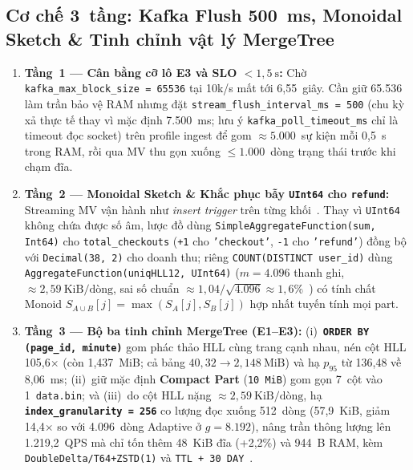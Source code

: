 \documentclass[13pt,a4paper]{report}
\begin{document}
\subsection{Cơ chế 3~tầng: Kafka Flush 500~ms, Monoidal Sketch \& Tinh chỉnh vật lý MergeTree}
\begin{enumerate}
    \setlength{\itemsep}{2pt}\setlength{\parskip}{0pt}
    \item \textbf{Tầng~1 --- Cân bằng cỡ lô E3 và SLO $< 1{,}5~\text{s}$:} Chờ \texttt{kafka\_\allowbreak{}max\_\allowbreak{}block\_\allowbreak{}size = 65536} tại 10k/s mất tới 6,55~giây. Cần giữ 65.536 làm trần bảo vệ RAM nhưng đặt \texttt{stream\_\allowbreak{}flush\_\allowbreak{}interval\_\allowbreak{}ms = 500} (chu kỳ xả thực tế thay vì mặc định 7.500~ms; lưu ý \texttt{kafka\_\allowbreak{}poll\_\allowbreak{}timeout\_\allowbreak{}ms} chỉ là timeout đọc socket) trên profile ingest để gom $\approx 5.000$~sự kiện mỗi 0,5~s trong RAM, rồi qua MV thu gọn xuống $\le 1.000$~dòng trạng thái trước khi chạm đĩa.
    \item \textbf{Tầng~2 --- Monoidal Sketch \& Khắc phục bẫy \texttt{UInt64} cho \texttt{refund}:} Streaming MV vận hành như \textit{insert trigger} trên từng khối~\cite{S14}. Thay vì \texttt{UInt64} không chứa được số âm, lược đồ dùng \texttt{SimpleAggregateFunction(sum, Int64)} cho \texttt{total\_\allowbreak{}checkouts} (\texttt{+1} cho \texttt{'checkout'}, \texttt{-1} cho \texttt{'refund'}) đồng bộ với \texttt{Decimal(38, 2)} cho doanh thu; riêng \texttt{COUNT(\allowbreak{}DISTINCT user\_\allowbreak{}id)} dùng \texttt{AggregateFunction(\allowbreak{}uniqHLL12, UInt64)} ($m = 4.096$ thanh ghi, $\approx 2{,}59~\text{KiB/dòng}$, sai số chuẩn $\approx 1{,}04/\sqrt{4.096} \approx 1{,}6\%$~\cite{A3, V3}) có tính chất Monoid $S_{A \cup B}[j] = \max(S_A[j], S_B[j])$ hợp nhất tuyến tính mọi part.
    \item \textbf{Tầng~3 --- Bộ ba tinh chỉnh MergeTree (E1--E3):} (i)~\textbf{\texttt{ORDER BY (page\_\allowbreak{}id, minute)}} gom phác thảo HLL cùng trang cạnh nhau, nén cột HLL 105,6${\times}$ (còn 1,437~MiB; cả bảng $40{,}32 \rightarrow 2{,}148~\text{MiB}$) và hạ $p_{95}$ từ 136,48 về 8,06~ms; (ii)~giữ mặc định \textbf{Compact Part} (\texttt{10~MiB}) gom gọn 7~cột vào 1~\texttt{data.bin}; và (iii)~do cột HLL nặng $\approx 2{,}59~\text{KiB/dòng}$, hạ \textbf{\texttt{index\_\allowbreak{}granularity = 256}} co lượng đọc xuống 512~dòng (57,9~KiB, giảm 14,4${\times}$ so với 4.096~dòng Adaptive ở $g=8.192$), nâng trần thông lượng lên 1.219,2~QPS mà chỉ tốn thêm 48~KiB đĩa (+2,2\%) và 944~B RAM, kèm \texttt{DoubleDelta/\allowbreak{}T64+ZSTD(1)} và \texttt{TTL + 30 DAY}~\cite{S15, S16}.
\end{enumerate}
\end{document}
